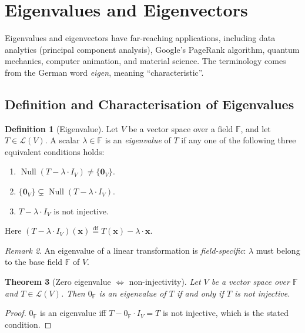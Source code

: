 \documentclass[11pt, a4paper, notitlepage]{report}
\newtheorem{theorem}{Theorem}[section]
\theoremstyle{definition}
\newtheorem{definition}[theorem]{Definition}
\theoremstyle{remark}
\newtheorem{remark}[theorem]{Remark}
\begin{document}
\section{Eigenvalues and Eigenvectors}
\label{sec:eigenvalues}

Eigenvalues and eigenvectors have far-reaching applications, including data analytics
(principal component analysis), Google's PageRank algorithm, quantum mechanics, computer
animation, and material science. The terminology comes from the German word
\emph{eigen}, meaning ``characteristic''.

\subsection{Definition and Characterisation of Eigenvalues}

\begin{definition}[Eigenvalue]\label{def:eigenvalue}
Let $V$ be a vector space over a field $\mathbb{F}$, and let $T \in \mathcal{L}(V)$. A
scalar $\lambda \in \mathbb{F}$ is an \emph{eigenvalue} of $T$ if any one of the following
three equivalent conditions holds:
\begin{enumerate}
  \item $\operatorname{Null}(T - \lambda \cdot I_V) \neq \{\mathbf{0}_V\}$.
  \item $\{\mathbf{0}_V\} \subsetneq \operatorname{Null}(T - \lambda \cdot I_V)$.
  \item $T - \lambda \cdot I_V$ is not injective.
\end{enumerate}
Here $(T - \lambda \cdot I_V)(\mathbf{x}) \stackrel{\mathrm{df}}{=} T(\mathbf{x}) - \lambda \cdot \mathbf{x}$.
\end{definition}

\begin{remark}
An eigenvalue of a linear transformation is \emph{field-specific}: $\lambda$ must belong to
the base field $\mathbb{F}$ of $V$.
\end{remark}

\begin{theorem}[Zero eigenvalue $\iff$ non-injectivity]\label{thm:zero-eigenvalue}
Let $V$ be a vector space over $\mathbb{F}$ and $T \in \mathcal{L}(V)$. Then
$0_{\mathbb{F}}$ is an eigenvalue of $T$ if and only if $T$ is not injective.
\end{theorem}

\begin{proof}
$0_{\mathbb{F}}$ is an eigenvalue iff $T - 0_{\mathbb{F}} \cdot I_V = T$ is not injective,
which is the stated condition.
\end{proof}
\end{document}
